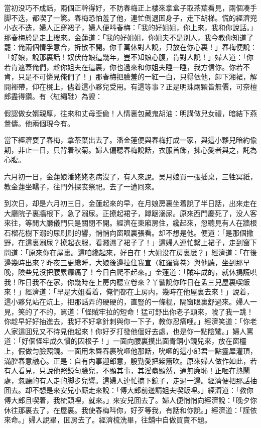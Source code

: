 當初没巧不成話，兩個正幹得好，不防春梅正上樓來拿盒子取茶葉看見，兩個凑手脚不迭，都喫了一驚。春梅恐怕羞了他，連忙倒退囬身子，走下胡梯。慌的經濟兜小衣不迭，婦人正穿裙子，婦人便呌春梅：「我的好姐姐，你上來，我和你說話。」那春梅於是走上樓來。金蓮道：「我的好姐姐，你姐夫不是別人，我今教你知道了罷：俺兩個情孚意合，拆散不開。你千萬休對人說，只放在你心裏！」春梅便說：「好娘，說那裏話！奴伏侍娘這幾年，豈不知娘心腹，肯對人說！」婦人道：「你若肯遮蓋俺們，趁你姐夫在這裏，你也過來和你姐夫睡一睡，我方信你。你若不肯，只是不可憐見俺們了！」那春梅把臉羞的一紅一白，只得依他，卸下湘裙，解開褌帶，仰在櫈上，儘着這小夥兒受用。有這等事？正是明珠兩顆皆無價，可奈檀郎盡得鑽。有〈紅繡鞋〉為證：

\begin{myquote}
假認做女婿親厚，往來和丈母歪偸！人情裏包藏鬼胡油：明講做兒女禮，暗結下燕鶯儔。他兩個現今有。
\end{myquote}

當下經濟耍了春梅，拿茶葉出去了。潘金蓮便與春梅打成一家，與這小夥兒暗約偸期，非止一日，只背着秋菊。婦人偏聽春梅說話，衣服首飾，揀心愛者與之，託為心腹。

六月初一日，金蓮娘潘姥姥老病沒了，有人來說。吴月娘買一張插桌，三牲冥紙，教金蓮坐轎子，往門外探丧祭祀。去了一遭囘來。

到次日，却是六月初三日，金蓮起來的早，在月娘房裏坐着說了半日話，出來走在大廳院子裏牆根下，急了溺尿。正撩起裙子，蹲踞溺尿。原來西門慶死了，没人客來往，等閒大廳儀門只是關閉不開。經濟在東廂房住，纔起來，忽聽見有人在牆根石榴花樹下溺的尿刷刷的響，悄悄向窗眼裏張看。却不想是他。便道：「是那個撒野，在這裏溺尿？撩起衣服，看濺濕了裙子了！」這婦人連忙繫上裙子，走到窗下問道：「原來你在屋裏。這咱纔起來，好自在！大姐没在房裏麽？」經濟道：「在後邊幾時出來？昨夜三更纔睡，大娘後邊拉住我宣〈紅羅寳卷〉與他聽，坐到那早晚，險些兒沒把腰累㿚瘑了！今日白爬不起來。」金蓮道：「賊牢成的，就休搗謊哄我！昨日我不在家，你幾時在上房内聽宣卷來？丫鬟說你昨日在孟三兒屋裏喫飯來！」經濟道：「早是大姐看着，俺們都在上房内，幾時在他屋裏去來！」說着，這小夥兒站在炕上，把那話弄的硬硬的，直豎的一條棍，隔窗眼裏舒過來。婦人一見，笑的了不的，駡道：「怪賊牢拉的短命！猛可舒出你老子頭來，唬了我一跳！你趁早好好抽進去，我好不好拿針刺與你一下子，教你忍痛哩。」經濟笑道：「你老人家這囬兒又不待見他起來！你好歹打發他個好去處，也是你一點陰騭。」婦人罵道：「好個怪牢成久慣的囚根子！」一面向腰裏摸出面青銅小鏡兒來，放在窗欞上，假做匀臉照鏡。一面用朱唇吞裹吮咂他那話，吮咂的這小郎君一點靈犀灌頂，滿腔春意融心。正是：自有内事迎郎意，殷勤愛把紫簫吹。原來婦人做作如此，若有人看見，只說他照鏡匀臉兒，不顯其事，其淫蠱顯然，通無廉恥！正咂在熱鬧處，忽聽的有人走的脚步兒響。這婦人連忙摘下鏡子，走過一邊。經濟便把那話抽囬去。却不想是來安兒小廝走來說：「傅大郎前邊請姐夫喫飯哩。」經濟道：「教你傅大郎且喫着，我梳頭哩，就來。」來安兒囬去了。婦人便悄悄向經濟說：「晚夕你休往那裏去了，在屋裏。我使春梅呌你，好歹等我，有話和你說。」經濟道：「謹依來命。」婦人說畢，囬房去了。經濟梳洗畢，往舖中自做買賣不題。

